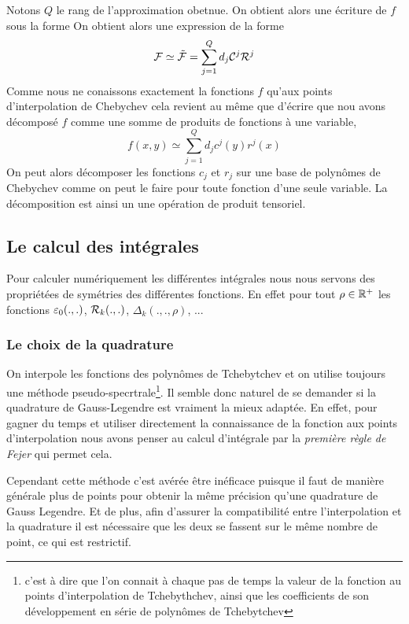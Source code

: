 \documentclass[10pt]{article}
\begin{document}
\begin{multicols}{2}
Notons $Q$ le rang de l'approximation obetnue. On obtient alors une écriture de $f$ sous la forme 
On obtient alors une expression de la forme 
\begin{equation}
\mathcal{F}  \simeq \tilde{\mathcal{F} } = \sum_{j=1}^Q d_j \mathcal{C} ^j \mathcal{R} ^j
\end{equation}
Comme nous ne conaissons exactement la fonctions $f$ qu'aux points d'interpolation de Chebychev cela revient au même que d'écrire que nou avons décomposé $f$ comme une somme de produits de fonctions à une variable,
\begin{equation}
f(x,y) \simeq \sum_{j=1}^Q d_jc^j(y)r^j(x)
\end{equation}
On peut alors décomposer les fonctions $c_j$ et $r_j$ sur une base de polynômes de Chebychev comme on peut le faire pour toute fonction d'une seule variable. La décomposition est ainsi un une opération de produit tensoriel. \\







\subsection{Le calcul des intégrales} 

Pour calculer numériquement les différentes intégrales nous nous servons des propriétées de symétries des différentes fonctions. En effet pour tout $\rho \in \mathbb{R}^+$ les fonctions $\varepsilon_0(.,.)$, $\mathcal{R}_k(.,.)$, $\Delta_k(.,.,\rho)$, ...


\subsubsection{Le choix de la quadrature}

On interpole les fonctions des polynômes de Tchebytchev et on utilise toujours une méthode pseudo-specrtrale\footnote{c'est à dire que l'on connait à chaque pas de temps la valeur de la fonction au points d'interpolation de Tchebythchev, ainsi que les coefficients de son développement en série de polynômes de Tchebytchev}. Il semble donc naturel de se demander si la quadrature de Gauss-Legendre est vraiment la mieux adaptée. En effet, pour gagner du temps et utiliser directement la connaissance de la fonction aux points d'interpolation nous avons penser au calcul d'intégrale par la \emph{première règle de Fejer} \cite{} qui permet cela.
 
Cependant cette méthode c'est avérée être inéficace puisque il faut de manière générale plus de points pour obtenir la même précision qu'une quadrature de Gauss Legendre. Et de plus, afin d'assurer la compatibilité entre l'interpolation et la quadrature il est nécessaire que les deux se fassent sur le même nombre de point, ce qui est restrictif. 


\end{multicols}
\end{document}
